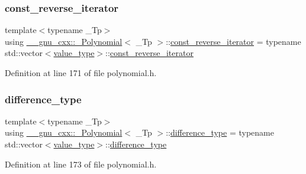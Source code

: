 \subsubsection{\texorpdfstring{const\+\_\+reverse\+\_\+iterator}{const\_reverse\_iterator}}
{\footnotesize\ttfamily template$<$typename \+\_\+\+Tp$>$ \\
using \hyperlink{class____gnu__cxx_1_1__Polynomial}{\+\_\+\+\_\+gnu\+\_\+cxx\+::\+\_\+\+Polynomial}$<$ \+\_\+\+Tp $>$\+::\hyperlink{class____gnu__cxx_1_1__Polynomial_a2a042a80127ab9a7b0349a54791e59af}{const\+\_\+reverse\+\_\+iterator} =  typename std\+::vector$<$\hyperlink{class____gnu__cxx_1_1__Polynomial_a725563351f50e76084a7a016c06f8a53}{value\+\_\+type}$>$\+::\hyperlink{class____gnu__cxx_1_1__Polynomial_a2a042a80127ab9a7b0349a54791e59af}{const\+\_\+reverse\+\_\+iterator}}



Definition at line 171 of file polynomial.\+h.

\mbox{\label{class____gnu__cxx_1_1__Polynomial_a1b1f56c1951282267a0d18a420f53b80}} 
\subsubsection{\texorpdfstring{difference\+\_\+type}{difference\_type}}
{\footnotesize\ttfamily template$<$typename \+\_\+\+Tp$>$ \\
using \hyperlink{class____gnu__cxx_1_1__Polynomial}{\+\_\+\+\_\+gnu\+\_\+cxx\+::\+\_\+\+Polynomial}$<$ \+\_\+\+Tp $>$\+::\hyperlink{class____gnu__cxx_1_1__Polynomial_a1b1f56c1951282267a0d18a420f53b80}{difference\+\_\+type} =  typename std\+::vector$<$\hyperlink{class____gnu__cxx_1_1__Polynomial_a725563351f50e76084a7a016c06f8a53}{value\+\_\+type}$>$\+::\hyperlink{class____gnu__cxx_1_1__Polynomial_a1b1f56c1951282267a0d18a420f53b80}{difference\+\_\+type}}



Definition at line 173 of file polynomial.\+h.

\mbox{\label{class____gnu__cxx_1_1__Polynomial_a64bd557b6af46992e352dbe9e30fa201}} 
